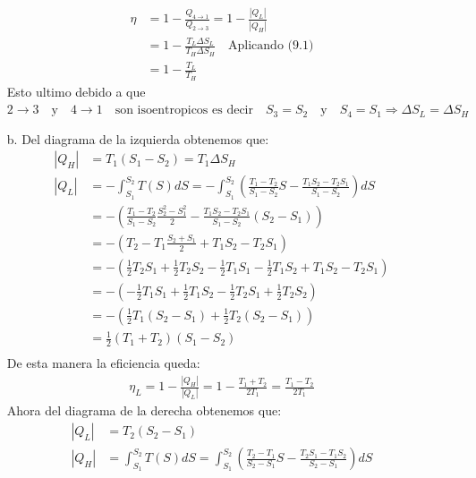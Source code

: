 \documentclass[a4paper]{article}
\begin{document}
\begin{answer}
\begin{itemize}
            \begin{align*}
                \eta &= 1 - \frac{Q_{4\rightarrow 1}}{Q_{2\rightarrow 3}} = 1 - \frac{|Q_L|}{|Q_H|}\\
                &= 1 - \frac{T_L \Delta S_L}{T_H \Delta S_H} \quad \text{Aplicando (9.1)}\\
                &= 1 - \frac{T_L}{T_H} \quad 
            \end{align*}
            Esto ultimo debido a que  $2\rightarrow 3 \quad \text{y} \quad 4\rightarrow 1 \quad \text{son isoentropicos es decir} \quad S_3 = S_2 \quad \text{y} \quad S_4 = S_1 \Rightarrow \Delta S_L = \Delta S_H$
            \item [b.] Del diagrama de la izquierda obtenemos que:
            \begin{align*}
                |Q_H| &= T_1 (S_ 1- S_2)= T_1 \Delta S_H \\
                |Q_L| &= -\int_{S_1}^{S_2} T(S) dS = -\int_{S_1}^{S_2} \left( \frac{T_1 - T_2 }{S_1 - S_2}S - \frac{T_1S_2 - T_2S_1}{S_1 - S_2}\right)dS \\
                &= -\left( \frac{T_1 - T_2 }{S_1 - S_2} \frac{S_2^2 - S_1^2}{2} - \frac{T_1S_2 - T_2S_1}{S_1 - S_2} (S_2 - S_1)\right)\\
                &=-\left( T_2 - T_1 \frac{S_2 + S_1}{2} + T_1S_2 - T_2S_1\right)\\
                &= - \left(\frac 12 T_2S_1 + \frac 12 T_2 S_2 - \frac 12 T_1 S_1 - \frac 12 T_1 S_2  + T_1S_2 -T_2S_1\right)\\
                &= - \left( -\frac 12 T_1 S_1 + \frac 12 T_1 S_2 - \frac 12 T_2 S_1 + \frac 12 T_2 S_2 \right)\\
                &= - \left( \frac 12 T_1 (S_2 - S_1) + \frac 12 T_2 (S_2- S_1) \right)\\
                &= \frac 12 (T_1 + T_2) (S_1 - S_2)\\
            \end{align*}
            De esta manera la eficiencia queda:
            \begin{align*}
                \eta_L = 1 - \frac{|Q_H|}{|Q_L|} = 1 - \frac{T_1 + T_2}{2T_1} = \frac{T_1 - T_2}{2T_1}
            \end{align*}
            Ahora del  diagrama de la derecha obtenemos que:
            \begin{align*}
                |Q_L| &= T_2 (S_ 2- S_1)\\
                |Q_H| &= \int_{S_1}^{S_2} T(S) dS = \int_{S_1}^{S_2} \left( \frac{T_2 - T_1 }{S_2 - S_1}S - \frac{T_2S_1 - T_1S_2}{S_2 - S_1}\right)dS \\

\end{align*}
\end{itemize}
\end{answer}
\end{document}
